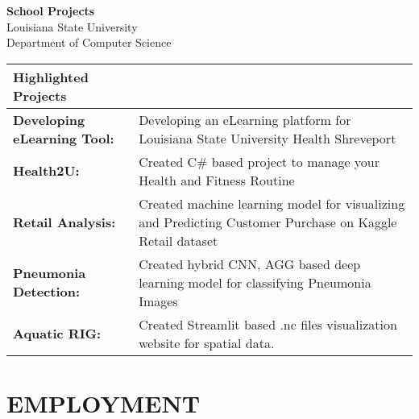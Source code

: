 \documentclass[a4paper,9pt]{article}
\begin{document}
\noindent
\textbf{School Projects} \\
Louisiana State University \\
Department of Computer Science \\
\begin{tabular}{|p{}|p{}|}
\hline
\textbf{Highlighted Projects} & \\
\hline
\textbf{Developing eLearning Tool:} & Developing an eLearning platform for Louisiana State University Health Shreveport \\
\hline
\textbf{Health2U:} & Created C\# based project to manage your Health and Fitness Routine \\
\hline
\textbf{Retail Analysis:} & Created machine learning model for visualizing and Predicting Customer Purchase on Kaggle Retail dataset \\
\hline
\textbf{Pneumonia Detection:} & Created hybrid CNN, AGG based deep learning model for classifying Pneumonia Images \\
\hline
\textbf{Aquatic RIG:} & Created Streamlit based .nc files visualization website for spatial data. \\
\hline
\end{tabular}

\section*{EMPLOYMENT}
\end{document}
